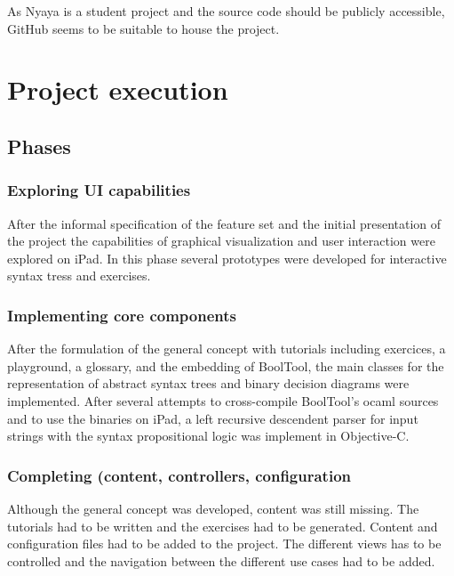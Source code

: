 As Nyaya is a student project and the source code should be publicly accessible,
GitHub seems to be suitable to house the project.

\section{Project execution}

\subsection{Phases}

\subsubsection{Exploring UI capabilities}

After the informal specification of the feature set and the initial presentation of the project
the capabilities of graphical visualization and  user interaction were explored on iPad.
In this phase several prototypes were developed for interactive syntax tress and exercises.

\subsubsection{Implementing core components}


After the formulation of the general concept with tutorials including exercices, a playground, a glossary, and the embedding of BoolTool,
the main classes for the representation of abstract syntax trees and binary decision diagrams were implemented.
After several attempts to cross-compile BoolTool's ocaml sources and to use the binaries on iPad, a left recursive descendent parser for input strings with the syntax propositional logic was implement in Objective-C. 

\subsubsection{Completing (content, controllers, configuration}

Although the general concept was developed, content was still missing. The tutorials had to be written and the exercises had to be generated. Content and configuration files had to be added to the project. 
The different views has to be controlled and the navigation between the different use cases had to be added. 

